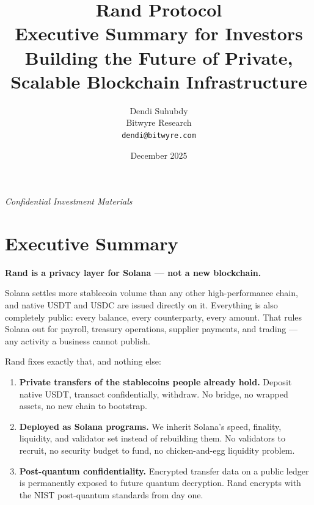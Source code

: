 \documentclass[11pt,a4paper]{article}
\title{\textbf{\color{randblue}\Huge Rand Protocol}\\[1em]
\Large Executive Summary for Investors\\[0.5em]
\large Building the Future of Private, Scalable Blockchain Infrastructure}
\author{Dendi Suhubdy\\
Bitwyre Research\\
\texttt{dendi@bitwyre.com}}
\date{December 2025}
\begin{document}
\maketitle
\thispagestyle{empty}

\vfill
\begin{center}
\textit{Confidential Investment Materials}
\end{center}
\newpage

\tableofcontents
\newpage

\section{Executive Summary}

\textbf{Rand is a privacy layer for Solana --- not a new blockchain.}

Solana settles more stablecoin volume than any other high-performance chain, and native USDT and USDC are issued directly on it. Everything is also completely public: every balance, every counterparty, every amount. That rules Solana out for payroll, treasury operations, supplier payments, and trading --- any activity a business cannot publish.

Rand fixes exactly that, and nothing else:

\begin{enumerate}[leftmargin=*]
    \item \textbf{Private transfers of the stablecoins people already hold.} Deposit native USDT, transact confidentially, withdraw. No bridge, no wrapped assets, no new chain to bootstrap.
    \item \textbf{Deployed as Solana programs.} We inherit Solana's speed, finality, liquidity, and validator set instead of rebuilding them. No validators to recruit, no security budget to fund, no chicken-and-egg liquidity problem.
    \item \textbf{Post-quantum confidentiality.} Encrypted transfer data on a public ledger is permanently exposed to future quantum decryption. Rand encrypts with the NIST post-quantum standards from day one.
\end{enumerate}

\begin{center}
\end{center}
\end{document}
